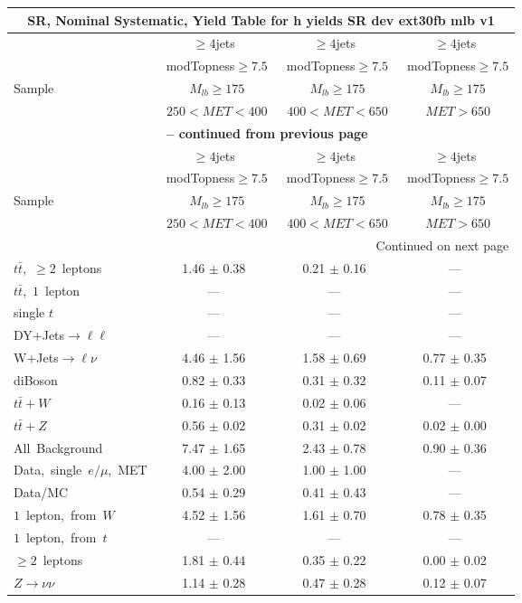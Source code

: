 \documentclass{article}
\begin{document}
\begin{longtable}{|l|c|c|c|} 
 
\multicolumn{4}{c}{ SR, Nominal Systematic, Yield Table for h yields SR dev ext30fb mlb v1 }\\* \hline 
  & $\ge4$jets  & $\ge4$jets  & $\ge4$jets \\* 
  & ~modTopness$\ge7.5$  & ~modTopness$\ge7.5$  & ~modTopness$\ge7.5$ \\* 
Sample  & ~$M_{lb}\ge175$  & ~$M_{lb}\ge175$  & ~$M_{lb}\ge175$ \\* 
  & ~$250<MET<400$  & ~$400<MET<650$  & ~$MET>650$ \\* 
\hline \hline 
\endfirsthead 
 
\multicolumn{4}{c}{{\bfseries \tablename\ \thetable{} -- continued from previous page}}\\* \hline 
  & $\ge4$jets  & $\ge4$jets  & $\ge4$jets \\* 
  & ~modTopness$\ge7.5$  & ~modTopness$\ge7.5$  & ~modTopness$\ge7.5$ \\* 
Sample  & ~$M_{lb}\ge175$  & ~$M_{lb}\ge175$  & ~$M_{lb}\ge175$ \\* 
  & ~$250<MET<400$  & ~$400<MET<650$  & ~$MET>650$ \\* 
\hline \hline 
\endhead 
 
\multicolumn{4}{|r|}{{Continued on next page}}\\* \hline 
\endfoot 
 
 
\endlastfoot 
 
$t\bar{t}$,~$\ge2$~leptons & 1.46 $\pm$ 0.38  & 0.21 $\pm$ 0.16  & --- \\* 
$t\bar{t}$,~$1$~lepton & ---  & ---  & --- \\* 
single $t$  & ---  & ---  & --- \\* 
DY+Jets$\rightarrow\ell\ell$  & ---  & ---  & --- \\* 
W+Jets$\rightarrow\ell\nu$  & 4.46 $\pm$ 1.56  & 1.58 $\pm$ 0.69  & 0.77 $\pm$ 0.35 \\* 
diBoson  & 0.82 $\pm$ 0.33  & 0.31 $\pm$ 0.32  & 0.11 $\pm$ 0.07 \\* 
$t\bar{t}+W$  & 0.16 $\pm$ 0.13  & 0.02 $\pm$ 0.06  & --- \\* 
$t\bar{t}+Z$  & 0.56 $\pm$ 0.02  & 0.31 $\pm$ 0.02  & 0.02 $\pm$ 0.00 \\* 
\hline \hline 
All~Background  & 7.47 $\pm$ 1.65  & 2.43 $\pm$ 0.78  & 0.90 $\pm$ 0.36 \\* 
Data,~single~$e/\mu$,~MET  & 4.00 $\pm$ 2.00  & 1.00 $\pm$ 1.00  & --- \\* 
Data/MC  & 0.54 $\pm$ 0.29  & 0.41 $\pm$ 0.43  & --- \\* 
\hline \hline 
$1$~lepton,~from~$W$  & 4.52 $\pm$ 1.56  & 1.61 $\pm$ 0.70  & 0.78 $\pm$ 0.35 \\* 
$1$~lepton,~from~$t$  & ---  & ---  & --- \\* 
$\ge2$~leptons  & 1.81 $\pm$ 0.44  & 0.35 $\pm$ 0.22  & 0.00 $\pm$ 0.02 \\* 
$Z\rightarrow\nu\nu$  & 1.14 $\pm$ 0.28  & 0.47 $\pm$ 0.28  & 0.12 $\pm$ 0.07 \\* 
\hline 
\end{longtable} 
\end{document}
